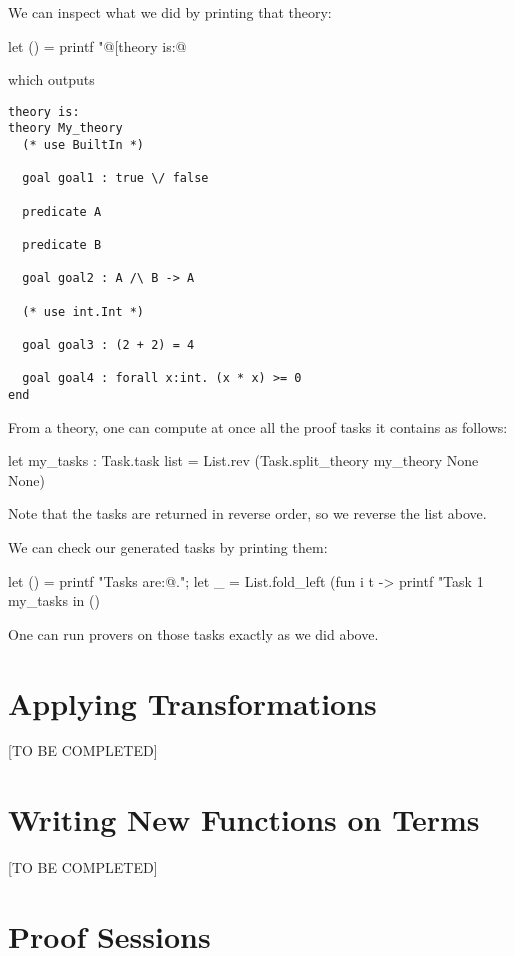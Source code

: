 We can inspect what we did by printing that theory:
\begin{ocamlcode}
let () = printf "@[theory is:@\n%
\end{ocamlcode}
which outputs
\begin{verbatim}
theory is:
theory My_theory
  (* use BuiltIn *)

  goal goal1 : true \/ false

  predicate A

  predicate B

  goal goal2 : A /\ B -> A

  (* use int.Int *)

  goal goal3 : (2 + 2) = 4

  goal goal4 : forall x:int. (x * x) >= 0
end
\end{verbatim}

From a theory, one can compute at once all the proof tasks it contains
as follows:
\begin{ocamlcode}
let my_tasks : Task.task list =
  List.rev (Task.split_theory my_theory None None)
\end{ocamlcode}
Note that the tasks are returned in reverse order, so we reverse the
list above.

We can check our generated tasks by printing them:
\begin{ocamlcode}
let () =
  printf "Tasks are:@.";
  let _ =
    List.fold_left
      (fun i t -> printf "Task %
      1 my_tasks
  in ()
\end{ocamlcode}

One can run provers on those tasks exactly as we did above.

\section{Applying Transformations}

[TO BE COMPLETED]

\section{Writing New Functions on Terms}

[TO BE COMPLETED]

\section{Proof Sessions}

